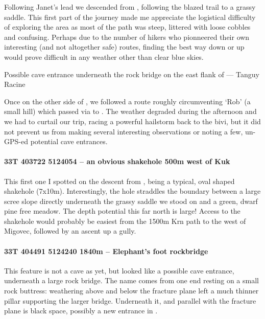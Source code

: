 Following Janet's lead we descended from , following the blazed trail to a grassy saddle. This first part of the journey made me appreciate the logistical difficulty of exploring the area as most of the path was steep, littered with loose cobbles and confusing. Perhaps due to the number of  hikers who pionneered their own interesting (and not altogether safe) routes, finding the best way down or up would prove difficult in any weather other than clear blue skies. 


\begin{marginfigure}
        \centering
        
        \caption{Possible cave entrance underneath the rock bridge on the east flank of \protect{}  --- Tanguy Racine} \label{rockbridge}
    \end{marginfigure}
    

Once on the other side of , we followed a route roughly circumventing `Rob' (a small hill) which passed via  to . The weather degraded during the afternoon and we had to curtail our trip, racing a powerful hailstorm back to the bivi, but it did not prevent us from making several interesting observations or noting a few, un-GPS-ed potential cave entrances.

\paragraph{33T 403722 5124054 – an obvious shakehole 500m west of Kuk}

This first one I spotted on the descent from , being a typical, oval shaped shakehole (7x10m). Interestingly, the hole straddles the boundary between a large scree slope directly underneath the grassy saddle we stood on and a green, dwarf pine free meadow. The depth potential this far north is large!  Access to the shakehole would probably be easiest from the 1500m Krn path to the west of Migovec, followed by an ascent up a gully. 

\paragraph{33T 404491 5124240  1840m – Elephant's foot rockbridge}


This feature is not a cave as yet, but looked like a possible cave entrance, underneath a large rock bridge. The name comes from one end resting on a small rock buttress: weathering above and below the fracture plane left a much thinner pillar supporting the larger bridge. Underneath it, and parallel with the fracture plane is black space, possibly a new entrance in .

